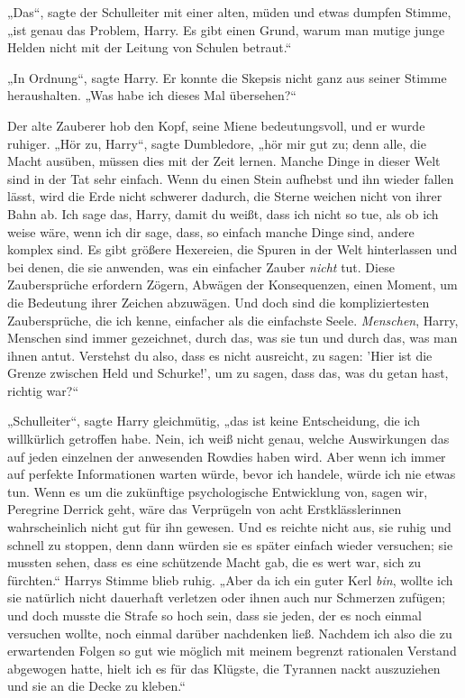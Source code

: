 {„Das“, sagte der Schulleiter mit einer alten, müden und etwas dumpfen Stimme, „ist genau das Problem, Harry. Es gibt einen Grund, warum man mutige junge Helden nicht mit der Leitung von Schulen betraut.“

„In Ordnung“, sagte Harry. Er konnte die Skepsis nicht ganz aus seiner Stimme heraushalten. „Was habe ich dieses Mal übersehen?“

Der alte Zauberer hob den Kopf, seine Miene bedeutungsvoll, und er wurde ruhiger. „Hör zu, Harry“, sagte Dumbledore, „hör mir gut zu; denn alle, die Macht ausüben, müssen dies mit der Zeit lernen. Manche Dinge in dieser Welt sind in der Tat sehr einfach. Wenn du einen Stein aufhebst und ihn wieder fallen lässt, wird die Erde nicht schwerer dadurch, die Sterne weichen nicht von ihrer Bahn ab. Ich sage das, Harry, damit du weißt, dass ich nicht so tue, als ob ich weise wäre, wenn ich dir sage, dass, so einfach manche Dinge sind, andere komplex sind. Es gibt größere Hexereien, die Spuren in der Welt hinterlassen und bei denen, die sie anwenden, was ein einfacher Zauber \emph{nicht} tut. Diese Zaubersprüche erfordern Zögern, Abwägen der Konsequenzen, einen Moment, um die Bedeutung ihrer Zeichen abzuwägen. Und doch sind die kompliziertesten Zaubersprüche, die ich kenne, einfacher als die einfachste Seele. \emph{Menschen}, Harry, Menschen sind immer gezeichnet, durch das, was sie tun und durch das, was man ihnen antut. Verstehst du also, dass es nicht ausreicht, zu sagen: 'Hier ist die Grenze zwischen Held und Schurke!', um zu sagen, dass das, was du getan hast, richtig war?“

„Schulleiter“, sagte Harry gleichmütig, „das ist keine Entscheidung, die ich willkürlich getroffen habe. Nein, ich weiß nicht genau, welche Auswirkungen das auf jeden einzelnen der anwesenden Rowdies haben wird. Aber wenn ich immer auf perfekte Informationen warten würde, bevor ich handele, würde ich nie etwas tun. Wenn es um die zukünftige psychologische Entwicklung von, sagen wir, Peregrine Derrick geht, wäre das Verprügeln von acht Erstklässlerinnen wahrscheinlich nicht gut für ihn gewesen. Und es reichte nicht aus, sie ruhig und schnell zu stoppen, denn dann würden sie es später einfach wieder versuchen; sie mussten sehen, dass es eine schützende Macht gab, die es wert war, sich zu fürchten.“ Harrys Stimme blieb ruhig. „Aber da ich ein guter Kerl \emph{bin}, wollte ich sie natürlich nicht dauerhaft verletzen oder ihnen auch nur Schmerzen zufügen; und doch musste die Strafe so hoch sein, dass sie jeden, der es noch einmal versuchen wollte, noch einmal darüber nachdenken ließ. Nachdem ich also die zu erwartenden Folgen so gut wie möglich mit meinem begrenzt rationalen Verstand abgewogen hatte, hielt ich es für das Klügste, die Tyrannen nackt auszuziehen und sie an die Decke zu kleben.“

}

